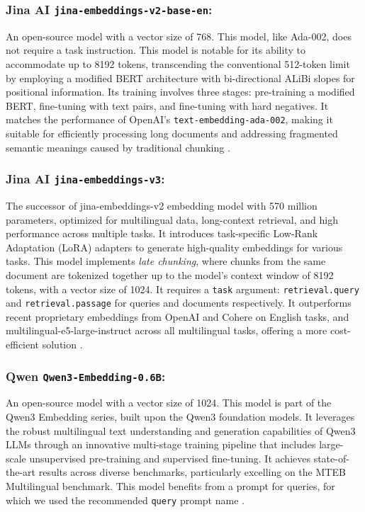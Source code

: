 \subsubsection{Jina AI \texttt{jina-embeddings-v2-base-en}:} An open-source model with a vector size of 768. This model, like Ada-002, does not require a task instruction. This model is notable for its ability to accommodate up to 8192 tokens, transcending the conventional 512-token limit by employing a modified BERT architecture with bi-directional ALiBi slopes for positional information. Its training involves three stages: pre-training a modified BERT, fine-tuning with text pairs, and fine-tuning with hard negatives. It matches the performance of OpenAI's \texttt{text-embedding-ada-002}, making it suitable for efficiently processing long documents and addressing fragmented semantic meanings caused by traditional chunking \autocite{günther2024jinaembeddings28192token}.

\subsubsection{Jina AI \texttt{jina-embeddings-v3}:} The successor of jina-embeddings-v2 embedding model with 570 million parameters, optimized for multilingual data, long-context retrieval, and high performance across multiple tasks. It introduces task-specific Low-Rank Adaptation (LoRA) adapters to generate high-quality embeddings for various tasks. This model implements \textit{late chunking}, where chunks from the same document are tokenized together up to the model's context window of 8192 tokens, with a vector size of 1024. It requires a \texttt{task} argument: \texttt{retrieval.query} and \texttt{retrieval.passage} for queries and documents respectively. It outperforms recent proprietary embeddings from OpenAI and Cohere on English tasks, and multilingual-e5-large-instruct across all multilingual tasks, offering a more cost-efficient solution \autocite{sturua2024jinaembeddingsv3multilingualembeddingstask}.

\subsubsection{Qwen \texttt{Qwen3-Embedding-0.6B}:} An open-source model with a vector size of 1024. This model is part of the Qwen3 Embedding series, built upon the Qwen3 foundation models. It leverages the robust multilingual text understanding and generation capabilities of Qwen3 LLMs through an innovative multi-stage training pipeline that includes large-scale unsupervised pre-training and supervised fine-tuning. It achieves state-of-the-art results across diverse benchmarks, particularly excelling on the MTEB Multilingual benchmark. This model benefits from a prompt for queries, for which we used the recommended \texttt{query} prompt name \autocite{zhang2025qwen3embeddingadvancingtext}.

